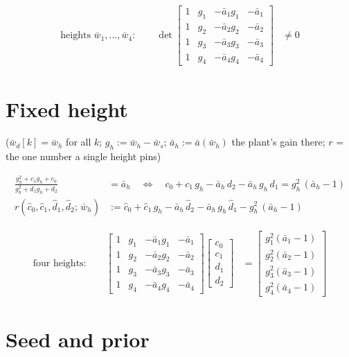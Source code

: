 \documentclass[11pt,a4paper,fontset=none]{ctexart}
\newcommand{\ba}{\bar{a}}
\newcommand{\bw}{\bar{w}}
\begin{document}
\begin{align*}
\text{heights } \bw_1,\dots,\bw_4:\qquad
\det\begin{bmatrix}
1 & g_1 & -\ba_1 g_1 & -\ba_1 \\
1 & g_2 & -\ba_2 g_2 & -\ba_2 \\
1 & g_3 & -\ba_3 g_3 & -\ba_3 \\
1 & g_4 & -\ba_4 g_4 & -\ba_4
\end{bmatrix} &\ne 0
\end{align*}

\section{Fixed height}

($\bw_d[k] = \bw_h$ for all $k$; $g_h := \bw_h - \bw_s$; $\ba_h := \ba(\bw_h)$ the plant's gain there; $r$ = the one number a single height pins)

\begin{align*}
\frac{g_h^{2} + c_1 g_h + c_0}{g_h^{2} + d_1 g_h + d_2} &= \ba_h
\quad\Longleftrightarrow\quad
c_0 + c_1\,g_h - \ba_h\,d_2 - \ba_h\,g_h\,d_1 = g_h^{2}\,(\ba_h - 1) \\[4pt]
r(\hat c_0, \hat c_1, \hat d_1, \hat d_2;\, \bw_h) &:= \hat c_0 + \hat c_1\,g_h - \ba_h\,\hat d_2 - \ba_h\,g_h\,\hat d_1 - g_h^{2}\,(\ba_h - 1)
\end{align*}

\begin{align*}
\text{four heights:}\qquad
\begin{bmatrix}
1 & g_1 & -\ba_1 g_1 & -\ba_1 \\
1 & g_2 & -\ba_2 g_2 & -\ba_2 \\
1 & g_3 & -\ba_3 g_3 & -\ba_3 \\
1 & g_4 & -\ba_4 g_4 & -\ba_4
\end{bmatrix}
\begin{bmatrix} c_0 \\ c_1 \\ d_1 \\ d_2 \end{bmatrix}
&= \begin{bmatrix} g_1^{2}(\ba_1 - 1) \\ g_2^{2}(\ba_2 - 1) \\ g_3^{2}(\ba_3 - 1) \\ g_4^{2}(\ba_4 - 1) \end{bmatrix}
\end{align*}

\section*{Seed and prior}
\end{document}
